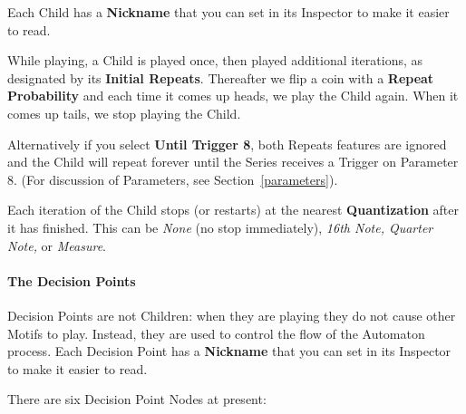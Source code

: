 \documentclass[twoside,10pt]{article}
\begin{document}
Each Child has a {\bf Nickname} that you can set in its Inspector to make it easier to read.

While playing, a Child is played once, then played additional iterations, as designated by its {\bf Initial Repeats}.  Thereafter we flip a coin with a {\bf Repeat Probability} and each time it comes up heads, we play the Child again.  When it comes up tails, we stop playing the Child.

Alternatively if you select {\bf Until Trigger 8}, both Repeats features are ignored and the Child  will repeat forever until the Series receives a Trigger on Parameter 8.  (For discussion of Parameters, see Section~\ref{parameters}).

Each iteration of the Child stops (or restarts) at the nearest {\bf Quantization} after it has finished.  This can be {\it None} (no stop immediately), {\it 16th Note, Quarter Note,} or {\it Measure}.



\paragraph{The Decision Points}

Decision Points are not Children: when they are playing they do not cause other Motifs to play.  Instead, they are used to control the flow of the Automaton process.    Each Decision Point has a {\bf Nickname} that you can set in its Inspector to make it easier to read.  

There are six Decision Point Nodes at present:
\end{document}
